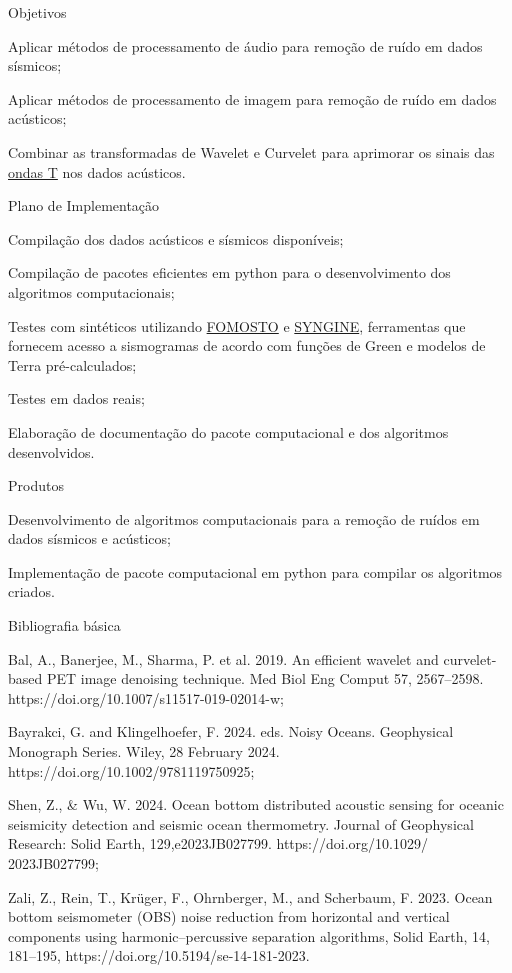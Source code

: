 \documentclass[10pt,a4paper,oneside]{book}
\begin{document}
\begin{fancyenum}{\faFutbol}{Objetivos}
	\item Aplicar métodos de processamento de áudio para remoção de ruído em dados sísmicos;
	\item Aplicar métodos de processamento de imagem para remoção de ruído em dados acústicos;
	\item Combinar as transformadas de Wavelet e Curvelet para aprimorar os sinais das \href{https://insu.hal.science/insu-00915042/document}{ondas T} nos dados acústicos.
\end{fancyenum}

\begin{fancyenum}{\faBrain}{Plano de Implementação}
	\item Compilação dos dados acústicos e sísmicos disponíveis;
	\item Compilação de pacotes eficientes em python para o desenvolvimento dos algoritmos computacionais;
	\item Testes com sintéticos utilizando \href{https://pyrocko.org/docs/current/apps/fomosto/tutorial.html}{FOMOSTO} e \href{https://ds.iris.edu/ds/products/syngine/}{SYNGINE}, ferramentas que fornecem acesso a sismogramas de acordo com funções de Green e modelos de Terra pré-calculados;
	\item Testes em dados reais;
	\item Elaboração de documentação do pacote computacional e dos algoritmos desenvolvidos.
\end{fancyenum}

\begin{fancyenum}{\faShoppingCart}{Produtos}
	\item Desenvolvimento de algoritmos computacionais para a remoção de ruídos em dados sísmicos e acústicos;
	\item Implementação de pacote computacional em python para compilar os algoritmos criados.
\end{fancyenum}

\begin{fancyenum}{\faBook}{Bibliografia básica}
	\item Bal, A., Banerjee, M., Sharma, P. et al. 2019. An efficient wavelet and curvelet-based PET image denoising technique. Med Biol Eng Comput 57, 2567–2598. https://doi.org/10.1007/s11517-019-02014-w;
	\item Bayrakci, G. and Klingelhoefer, F. 2024. eds. Noisy Oceans. Geophysical Monograph Series. Wiley, 28 February 2024. https://doi.org/10.1002/9781119750925;
	\item Shen, Z., \& Wu, W. 2024. Ocean bottom distributed acoustic sensing for oceanic seismicity detection and seismic ocean thermometry. Journal of Geophysical Research: Solid Earth, 129,e2023JB027799. https://doi.org/10.1029/
2023JB027799;
	\item Zali, Z., Rein, T., Krüger, F., Ohrnberger, M., and Scherbaum, F. 2023. Ocean bottom seismometer (OBS) noise reduction from horizontal and vertical components using harmonic–percussive separation algorithms, Solid Earth, 14, 181–195, https://doi.org/10.5194/se-14-181-2023.
\end{fancyenum}
\end{document}
